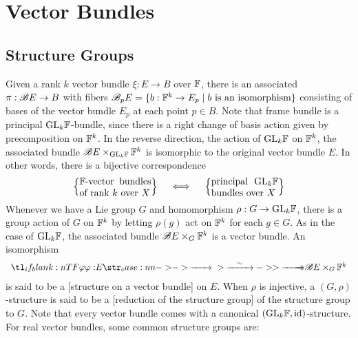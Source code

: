 \chapter{Vector Bundles}\label{chap:vector-bundles}

\begin{epigraph}{10em}{}
\end{epigraph}

\section{Structure Groups}

Given a rank $k$ vector bundle $\xi : E \to B$ over $\mathbb{F}$, there is an associated  $\pi : \mathscr{B} E \to B$ with fibers $\mathscr{B}_p E = \{ b : \mathbb{F}^k \to E_p \mid b\textrm{ is an isomorphism}\}$ consisting of bases of the vector bundle $E_p$ at each point $p\in B$. Note that frame bundle is a principal $\mathrm{GL}_k\mathbb{F}$-bundle, since there is a right change of basis action given by precomposition on $\mathbb{F}^k$.
In the reverse direction, the action of $\mathrm{GL}_k\mathbb{F}$ on $\mathbb{F}^k$, the associated bundle $\mathscr{B} E\times_{\mathrm{GL}_k\mathbb{F}} \mathbb{F}^k$ is isomorphic to the original vector bundle $E$. In other words, there is a bijective correspondence
\begin{equation}\label{eq:principal-GL-bundle-vector-bundle}
	\left\{\parbox{7.5em}{$\F$-vector bundles of rank $k$ over $X$}\right\}
	\quad\iff\quad
	\left\{\parbox{7em}{principal $\GL_k\F$ bundles over $X$}\right\}
\end{equation}
Whenever we have a Lie group $G$ and homomorphism $\rho : G \to \mathrm{GL}_k\mathbb{F}$, there is a group action of $G$ on $\mathbb{F}^k$ by letting $\rho(g)$ act on $\mathbb{F}^k$ for each $g\in G$. As in the case of $\mathrm{GL}_k \mathbb{F}$, the associated bundle $\mathscr{B} E\times_G \mathbb{F}^k$ is a vector bundle. An isomorphism
\begin{equation}\label{eq:structure-on-a-vector-bundle}
	\lkxfunc{\varphi}{E}{\B E\times_G \F^k}
\end{equation}
is said to be a [structure on a vector bundle] on $E$. When $\rho$ is injective, a $(G,\rho)$-structure is said to be a [reduction of the structure group] of the structure group to $G$.
Note that every vector bundle comes with a canonical $(\mathrm{GL}_k \mathbb{F}, \mathrm{id})$-structure.
For real vector bundles, some common structure groups are:
